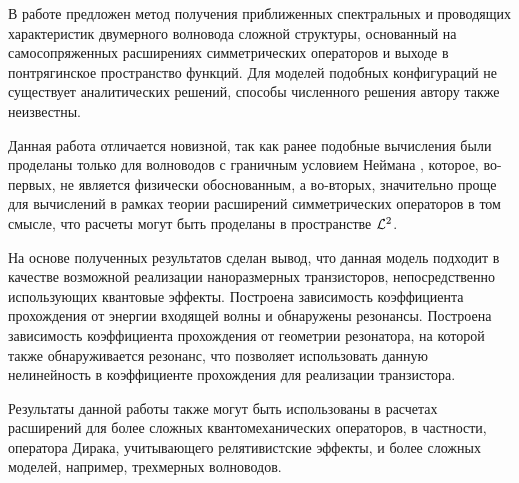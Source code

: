 \startconclusionpage

В работе предложен метод получения приближенных спектральных и проводящих характеристик двумерного волновода сложной структуры, основанный на самосопряженных расширениях симметрических операторов и выходе в понтрягинское пространство функций. Для моделей подобных конфигураций не существует аналитических решений, способы численного решения автору также неизвестны.

Данная работа отличается новизной, так как ранее подобные вычисления были проделаны только для волноводов с граничным условием Неймана \cite{popov1993zero}, которое, во-первых, не является физически обоснованным, а во-вторых, значительно проще для вычислений в рамках теории расширений симметрических операторов в том смысле, что расчеты могут быть проделаны в пространстве $\mathcal{L}^2$.

На основе полученных результатов сделан вывод, что данная модель подходит в качестве возможной реализации наноразмерных транзисторов, непосредственно использующих квантовые эффекты. Построена зависимость коэффициента прохождения от энергии входящей волны и обнаружены резонансы. Построена зависимость коэффициента прохождения от геометрии резонатора, на которой также обнаруживается резонанс, что позволяет использовать данную нелинейность в коэффициенте прохождения для реализации транзистора.

Результаты данной работы также могут быть использованы в расчетах расширений для более сложных квантомеханических операторов, в частности, оператора Дирака, учитывающего релятивистские эффекты, и более сложных моделей, например, трехмерных волноводов.

